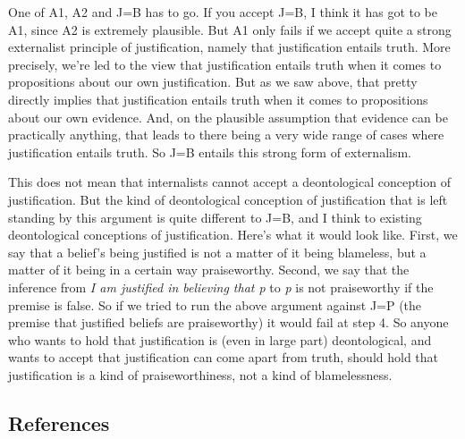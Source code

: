 \documentclass[
  10pt,
  letterpaper,
  DIV=11,
  numbers=noendperiod,
  twoside]{scrartcl}
\begin{document}
One of A1, A2 and J=B has to go. If you accept J=B, I think it has got
to be A1, since A2 is extremely plausible. But A1 only fails if we
accept quite a strong externalist principle of justification, namely
that justification entails truth. More precisely, we're led to the view
that justification entails truth when it comes to propositions about our
own justification. But as we saw above, that pretty directly implies
that justification entails truth when it comes to propositions about our
own evidence. And, on the plausible assumption that evidence can be
practically anything, that leads to there being a very wide range of
cases where justification entails truth. So J=B entails this strong form
of externalism.

This does not mean that internalists cannot accept a deontological
conception of justification. But the kind of deontological conception of
justification that is left standing by this argument is quite different
to J=B, and I think to existing deontological conceptions of
justification. Here's what it would look like. First, we say that a
belief's being justified is not a matter of it being blameless, but a
matter of it being in a certain way praiseworthy. Second, we say that
the inference from \emph{I am justified in believing that p} to \emph{p}
is not praiseworthy if the premise is false. So if we tried to run the
above argument against J=P (the premise that justified beliefs are
praiseworthy) it would fail at step 4. So anyone who wants to hold that
justification is (even in large part) deontological, and wants to accept
that justification can come apart from truth, should hold that
justification is a kind of praiseworthiness, not a kind of
blamelessness.

\subsection*{References}\label{references}
\end{document}

